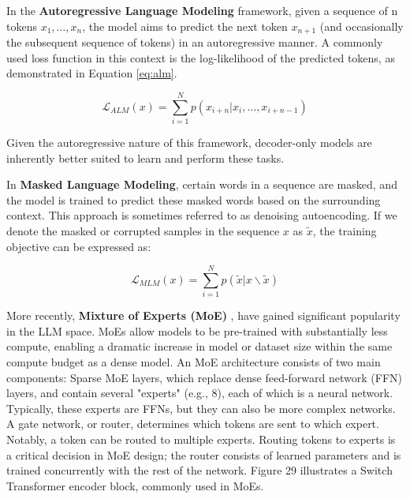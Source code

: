 In the \textbf{Autoregressive Language Modeling} framework, given a sequence of n tokens \( x_1, \ldots, x_n \), the model aims to predict the next token \( x_{n+1} \) (and occasionally the subsequent sequence of tokens) in an autoregressive manner. A commonly used loss function in this context is the log-likelihood of the predicted tokens, as demonstrated in Equation \ref{eq:alm}.

\begin{equation}\label{eq:alm}
    \mathcal{L}_{ALM}(x) = \sum_{i=1}^N p(x_{i+n} |x_i, \ldots, x_{i+n-1})
\end{equation}

Given the autoregressive nature of this framework, decoder-only models are inherently better suited to learn and perform these tasks.

\hfill

In \textbf{Masked Language Modeling}, certain words in a sequence are masked, and the model is trained to predict these masked words based on the surrounding context. This approach is sometimes referred to as denoising autoencoding. If we denote the masked or corrupted samples in the sequence \( x \) as \( \tilde{x} \), the training objective can be expressed as:


\begin{equation}
    \mathcal{L}_{MLM}(x) = \sum_{i=1}^N p(\tilde{x}|x\backslash \tilde{x})
\end{equation}

\hfill

More recently, \textbf{Mixture of Experts (MoE)} \cite{shazeer2017outrageously}, \cite{fedus2022switch} have gained significant popularity in the LLM space. MoEs allow models to be pre-trained with substantially less compute, enabling a dramatic increase in model or dataset size within the same compute budget as a dense model. An MoE architecture consists of two main components: Sparse MoE layers, which replace dense feed-forward network (FFN) layers, and contain several "experts" (e.g., 8), each of which is a neural network. Typically, these experts are FFNs, but they can also be more complex networks. A gate network, or router, determines which tokens are sent to which expert. Notably, a token can be routed to multiple experts. Routing tokens to experts is a critical decision in MoE design; the router consists of learned parameters and is trained concurrently with the rest of the network. Figure 29 illustrates a Switch Transformer encoder block, commonly used in MoEs.



